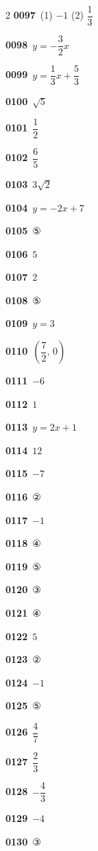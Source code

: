 \documentclass[10pt,a4paper]{article}
\begin{document}
\begin{multicols}{2}
\noindent\textbf{0097}\ (1) $-1$ (2) $\dfrac{1}{3}$\par
\noindent\textbf{0098}\ $y=-\dfrac{3}{2}x$\par
\noindent\textbf{0099}\ $y=\dfrac{1}{3}x+\dfrac{5}{3}$\par
\noindent\textbf{0100}\ $\sqrt{5}$\par
\noindent\textbf{0101}\ $\dfrac{1}{2}$\par
\noindent\textbf{0102}\ $\dfrac{6}{5}$\par
\noindent\textbf{0103}\ $3\sqrt{2}$\par
\noindent\textbf{0104}\ $y=-2x+7$\par
\noindent\textbf{0105}\ ⑤\par
\noindent\textbf{0106}\ $5$\par
\noindent\textbf{0107}\ $2$\par
\noindent\textbf{0108}\ ⑤\par
\noindent\textbf{0109}\ $y=3$\par
\noindent\textbf{0110}\ $\left(\dfrac{7}{2},\,0\right)$\par
\noindent\textbf{0111}\ $-6$\par
\noindent\textbf{0112}\ $1$\par
\noindent\textbf{0113}\ $y=2x+1$\par
\noindent\textbf{0114}\ $12$\par
\noindent\textbf{0115}\ $-7$\par
\noindent\textbf{0116}\ ②\par
\noindent\textbf{0117}\ $-1$\par
\noindent\textbf{0118}\ ④\par
\noindent\textbf{0119}\ ⑤\par
\noindent\textbf{0120}\ ③\par
\noindent\textbf{0121}\ ④\par
\noindent\textbf{0122}\ $5$\par
\noindent\textbf{0123}\ ②\par
\noindent\textbf{0124}\ $-1$\par
\noindent\textbf{0125}\ ⑤\par
\noindent\textbf{0126}\ $\dfrac{4}{7}$\par
\noindent\textbf{0127}\ $\dfrac{2}{3}$\par
\noindent\textbf{0128}\ $-\dfrac{4}{3}$\par
\noindent\textbf{0129}\ $-4$\par
\noindent\textbf{0130}\ ③\par

\end{multicols}
\end{document}
